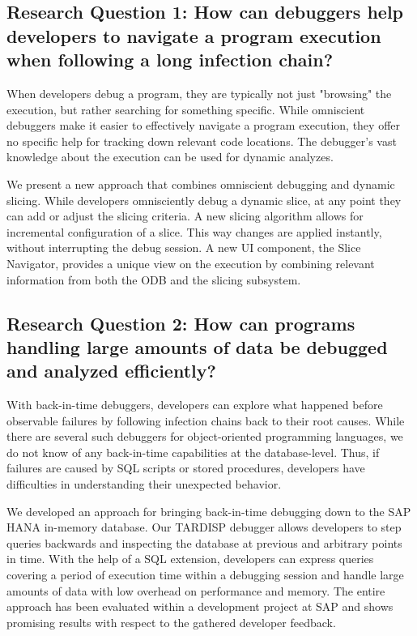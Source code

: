 \newcommand{\RQ}[1]{\subsection*{#1}}

\RQ{Research Question 1: How can debuggers help developers to navigate a program execution when following a long infection chain?}

When developers debug a program, they are typically not just "browsing" the execution, but rather searching for something specific.
While omniscient debuggers make it easier to effectively navigate a program execution, they offer no specific help for tracking down relevant code locations.
The debugger's vast knowledge about the execution can be used for dynamic analyzes.

We present a new approach that combines omniscient debugging and dynamic slicing. 
While developers omnisciently debug a dynamic slice, at any point they can add or adjust the slicing criteria.
A new slicing algorithm allows for incremental configuration of a slice. 
This way changes are applied instantly, without interrupting the debug session. 
A new UI component, the Slice Navigator, provides a unique view on the execution by combining relevant information from both the ODB and the slicing subsystem.

\RQ{Research Question 2: How can programs handling large amounts of data be debugged and analyzed efficiently?}

With back-in-time debuggers, developers can explore what happened before observable failures by following infection chains back to their root causes. 
While there are several such debuggers for object-oriented programming languages, we do not know of any back-in-time capabilities at the database-level.
Thus, if failures are caused by SQL scripts or stored procedures, developers have difficulties in understanding their unexpected behavior.

We developed an approach for bringing back-in-time debugging down to the SAP HANA in-memory database.
Our TARDISP debugger allows developers to step queries backwards and inspecting the database at previous and arbitrary points in time. 
With the help of a SQL extension, developers can express queries covering a period of execution time within a debugging session and handle large amounts of data with low overhead on performance and memory. 
The entire approach has been evaluated within a development project at SAP and shows promising results with respect to the gathered developer feedback.

